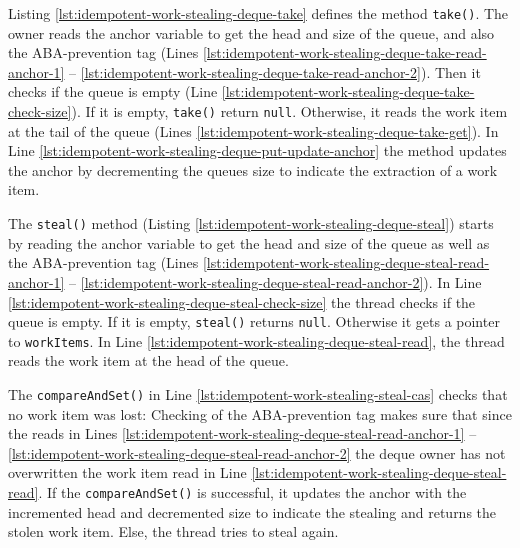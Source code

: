 

Listing \ref{lst:idempotent-work-stealing-deque-take} defines the
method \lstinline!take()!. The owner reads the anchor variable to get
the head and size of the queue, and also the ABA-prevention tag (Lines
\ref{lst:idempotent-work-stealing-deque-take-read-anchor-1} --
\ref{lst:idempotent-work-stealing-deque-take-read-anchor-2}). Then it
checks if the queue is empty (Line
\ref{lst:idempotent-work-stealing-deque-take-check-size}). If it is
empty, \lstinline!take()! return \lstinline!null!. Otherwise, it reads
the work item at the tail of the queue (Lines
\ref{lst:idempotent-work-stealing-deque-take-get}). In Line
\ref{lst:idempotent-work-stealing-deque-put-update-anchor} the method
updates the anchor by decrementing the queues size to indicate the
extraction of a work item.




The \lstinline!steal()! method (Listing
\ref{lst:idempotent-work-stealing-deque-steal}) starts by reading the
anchor variable to get the head and size of the queue as well as the
ABA-prevention tag (Lines
\ref{lst:idempotent-work-stealing-deque-steal-read-anchor-1} --
\ref{lst:idempotent-work-stealing-deque-steal-read-anchor-2}). In Line
\ref{lst:idempotent-work-stealing-deque-steal-check-size} the thread
checks if the queue is empty. If it is empty, \lstinline!steal()!
returns \lstinline!null!. Otherwise it gets a pointer to
\lstinline!workItems!. In Line
\ref{lst:idempotent-work-stealing-deque-steal-read}, the thread reads
the work item at the head of the queue.

The \lstinline!compareAndSet()! in Line
\ref{lst:idempotent-work-stealing-steal-cas} checks that no work item
was lost: Checking of the ABA-prevention tag makes sure that since the
reads in Lines
\ref{lst:idempotent-work-stealing-deque-steal-read-anchor-1} --
\ref{lst:idempotent-work-stealing-deque-steal-read-anchor-2} the deque
owner has not overwritten the work item read in Line
\ref{lst:idempotent-work-stealing-deque-steal-read}. If the
\lstinline!compareAndSet()! is successful, it updates the anchor with
the incremented head and decremented size to indicate the stealing and
returns the stolen work item. Else, the thread tries to steal again.

